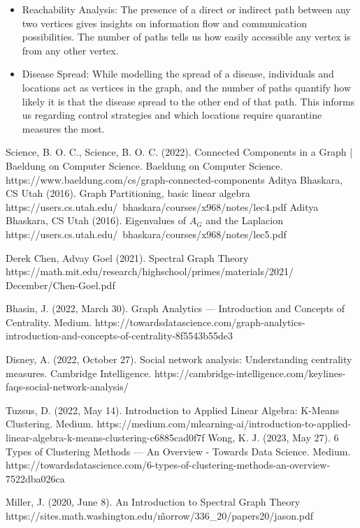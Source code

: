 \documentclass[12pt, a4paper]{article}
\begin{document}
\begin{flushleft}
\begin{itemize}
        \item Reachability Analysis: The presence of a direct or indirect path between any two vertices gives insights on information flow and communication possibilities. The number of paths tells us how easily accessible any vertex is from any other vertex.

        \item Disease Spread: While modelling the spread of a disease, individuals and locations act as vertices in the graph, and the number of paths quantify how likely it is that the disease spread to the other end of that path. This informs us regarding control strategies and which locations require quarantine measures the most.
      \end{itemize}

    \end{flushleft} 

    \begin{thebibliography}{9}
    Science, B. O. C., Science, B. O. C. (2022). Connected Components in a Graph | Baeldung on Computer Science. Baeldung on Computer Science. https://www.baeldung.com/cs/graph-connected-components
    Aditya Bhaskara, CS Utah (2016). Graph Partitioning, basic linear algebra https://users.cs.utah.edu/~bhaskara/courses/x968/notes/lec4.pdf
    Aditya Bhaskara, CS Utah (2016). Eigenvalues of $A_G$ and the Laplacion https://users.cs.utah.edu/~bhaskara/courses/x968/notes/lec5.pdf

    Derek Chen, Advay Goel (2021). Spectral Graph Theory https://math.mit.edu/research/highschool/primes/materials/2021/\\December/Chen-Goel.pdf

    Bhasin, J. (2022, March 30). Graph Analytics — Introduction and Concepts of Centrality. Medium. https://towardsdatascience.com/graph-analytics-introduction-and-concepts-of-centrality-8f5543b55de3

    Disney, A. (2022, October 27). Social network analysis: Understanding centrality measures. Cambridge Intelligence. https://cambridge-intelligence.com/keylines-faqs-social-network-analysis/

    Tuzsus, D. (2022, May 14). Introduction to Applied Linear Algebra: K-Means Clustering. Medium. https://medium.com/mlearning-ai/introduction-to-applied-linear-algebra-k-means-clustering-c6885cad0f7f
    Wong, K. J. (2023, May 27). 6 Types of Clustering Methods — An Overview - Towards Data Science. Medium. https://towardsdatascience.com/6-types-of-clustering-methods-an-overview-7522dba026ca

    Miller, J. (2020, June 8). An Introduction to Spectral Graph Theory https://sites.math.washington.edu/\~morrow/336\_20/papers20/jason.pdf

    \end{thebibliography}
\end{document}
